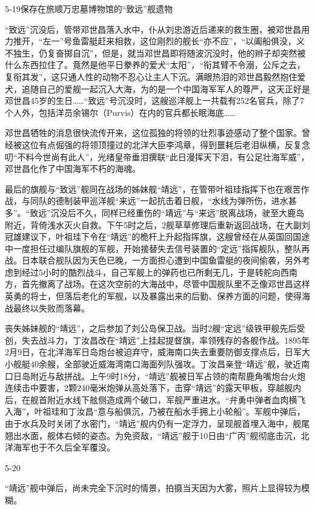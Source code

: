 \documentclass[12pt,UTF8]{ctexbook}
\begin{document}
5-19保存在旅顺万忠墓博物馆的“致远”舰遗物

“致远”沉没后，管带邓世昌落入水中，仆从刘忠游近后递来的救生圈，被邓世昌用力推开，“左一”号鱼雷艇赶来相救，这位刚烈的舰长“亦不应”，“以阖船俱没，义不独生，仍复奋掷自沉”，但是，就当邓世昌即将随波沉没时，他的辫子却突然被什么东西拉住了。竟然是他平日豢养的爱犬“太阳”，“衔其臂不令溺，公斥之去，复衔其发”，这只通人性的动物不忍心让主人下沉。满眼热泪的邓世昌毅然抱住爱犬，追随自己的爱舰一起沉入大海，为的是一个中国海军军人的尊严，这天正好是邓世昌45岁的生日……“致远”号沉没时，这艘巡洋舰上一共载有252名官兵，除了7个人外，包括洋员余锡尔（Purvis）在内的官兵都长眠海底……

邓世昌牺牲的消息很快流传开来，这位孤独的将领的壮烈事迹感动了整个国家。曾经被这位有点倔强的将领顶撞过的北洋大臣李鸿章，得到噩耗后老泪纵横，反复念叨“不料今世尚有此人”，光绪皇帝垂泪撰联“此日漫挥天下泪，有公足壮海军威”，邓世昌化作了中国海军不朽的海魂。

最后的旗舰与“致远”舰同在战场的姊妹舰“靖远”，在管带叶祖珪指挥下也在艰苦作战，与同队的德制装甲巡洋舰“来远”一起抗击着日舰，“水线为弹所伤，进水甚多”。“致远”沉没后不久，同样已经重伤的“靖远”与“来远”脱离战场，驶至大鹿岛附近，背倚浅水灭火自救。下午5时之后，2舰草草修理后重新返回战场，在大副刘冠雄建议下，叶祖珪下令在“靖远”的桅杆上升起指挥旗，这艘曾经在从英国回国途中一度担任过编队旗舰的军舰，开始接替失去信号装置的“定远”指挥舰队，整队再战。日本联合舰队因为天色已晚，一方面担心遭到中国鱼雷艇的夜间偷袭，另外考虑到经过5小时的酷烈战斗，自己军舰上的弹药也已所剩无几，于是转舵向西南方，首先撤离了战场。在这次空前的大海战中，尽管中国舰队里不乏像邓世昌这样英勇的将士，但落后老化的军舰，以及暴露出来的后勤、保养方面的问题，使得海战最终以失败而落幕。

丧失姊妹舰的“靖远”，之后参加了刘公岛保卫战。当时2艘“定远”级铁甲舰先后受创，失去战斗力，丁汝昌改在“靖远”上挂起提督旗，率领残存的各舰作战。1895年2月9日，在北洋海军日岛炮台被迫弃守，威海南口失去重要防御支撑点后，日军大小舰艇40余艘，全部驶近威海湾南口海面列队强攻。丁汝昌亲登“靖远”舰，驶近南口日岛附近与敌拼战。上午9时18分，“靖远”舰被日军占领的南帮鹿角嘴炮台火炮连续击中要害，2颗240毫米炮弹从高处落下，击穿“靖远”的露天甲板，穿越舰内后，在舰首附近水线下舷侧造成两个破口，军舰严重进水。“弁勇中弹者血肉横飞入海”，叶祖珪和丁汝昌“意与船俱沉，乃被在船水手拥上小轮船”。军舰中弹后，由于水兵及时关闭了水密门，“靖远”舰内仍有一定浮力，呈现舰首埋入海中，舰尾翘出水面，舰体右倾的姿态。为免资敌，“靖远”舰于10日由“广丙”舰彻底击沉，北洋海军也于不久后全军覆没。

5-20

“靖远”舰中弹后，尚未完全下沉时的情景，拍摄当天因为大雾，照片上显得较为模糊。
\end{document}
